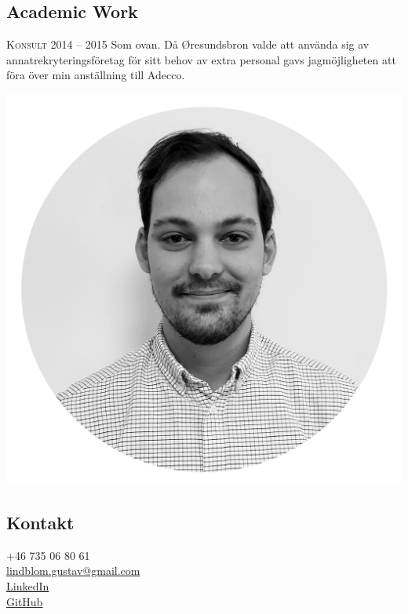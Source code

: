\documentclass[usenames,dvipsnames]{article}
\begin{document}
\begin{minipage}[t]{0.65\textwidth}
\subsection*{\textcolor{NavyBlue}{Academic Work}}
\begin{flushleft}
\textsc{Konsult 2014 -- 2015}\break
Som ovan. Då Øresundsbron valde att använda sig av annatrekryteringsföretag för sitt behov av extra personal gavs jagmöjligheten att föra över min anställning till Adecco.
\end{flushleft}

\end{minipage}
\hspace{1.6cm}\begin{minipage}[t]{0.4\textwidth}
\vspace{0cm}
\begin{flushleft}
\begin{center}
\noindent\includegraphics[scale=0.03]{gustavlindblom}
\end{center}
\subsection*{\textcolor{NavyBlue}{Kontakt}}

\faPhone \qquad +46 735 06 80 61\\
\faEnvelope \qquad \href{mailto:lindblom.gustav@gmail.com}{lindblom.gustav@gmail.com}\\
\faLinkedin \qquad \href{https://www.linkedin.com/in/gustav-lindblom-a1529912a/}{LinkedIn}\\
\faGithub \qquad \href{https://github.com/glindblom}{GitHub}



\end{flushleft}
\end{minipage}
\end{document}
